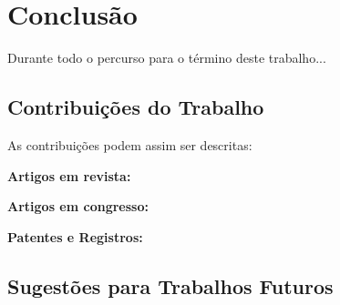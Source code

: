 
\chapter{Conclusão} %
\label{chap:canclusao} %


Durante todo o percurso para o término deste trabalho... 

\section{Contribuições do Trabalho}
As contribuições podem assim ser descritas:


\textbf{Artigos em revista:}

\textbf{Artigos em congresso:}

\textbf{Patentes e Registros:}

\section{Sugestões para Trabalhos Futuros}






